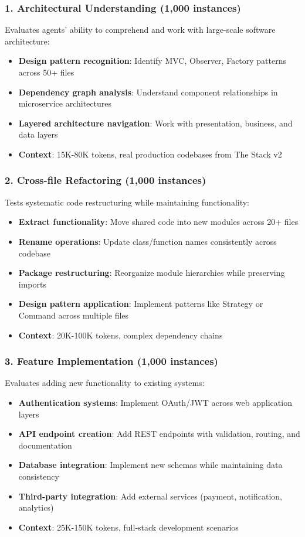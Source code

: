 \documentclass{article}
\begin{document}
\subsubsection{1. Architectural Understanding (1,000 instances)}
Evaluates agents' ability to comprehend and work with large-scale software architecture:
\begin{itemize}
    \item \textbf{Design pattern recognition}: Identify MVC, Observer, Factory patterns across 50+ files
    \item \textbf{Dependency graph analysis}: Understand component relationships in microservice architectures
    \item \textbf{Layered architecture navigation}: Work with presentation, business, and data layers
    \item \textbf{Context}: 15K-80K tokens, real production codebases from The Stack v2
\end{itemize}

\subsubsection{2. Cross-file Refactoring (1,000 instances)}
Tests systematic code restructuring while maintaining functionality:
\begin{itemize}
    \item \textbf{Extract functionality}: Move shared code into new modules across 20+ files
    \item \textbf{Rename operations}: Update class/function names consistently across codebase
    \item \textbf{Package restructuring}: Reorganize module hierarchies while preserving imports
    \item \textbf{Design pattern application}: Implement patterns like Strategy or Command across multiple files
    \item \textbf{Context}: 20K-100K tokens, complex dependency chains
\end{itemize}

\subsubsection{3. Feature Implementation (1,000 instances)}
Evaluates adding new functionality to existing systems:
\begin{itemize}
    \item \textbf{Authentication systems}: Implement OAuth/JWT across web application layers
    \item \textbf{API endpoint creation}: Add REST endpoints with validation, routing, and documentation
    \item \textbf{Database integration}: Implement new schemas while maintaining data consistency
    \item \textbf{Third-party integration}: Add external services (payment, notification, analytics)
    \item \textbf{Context}: 25K-150K tokens, full-stack development scenarios
\end{itemize}
\end{document}
